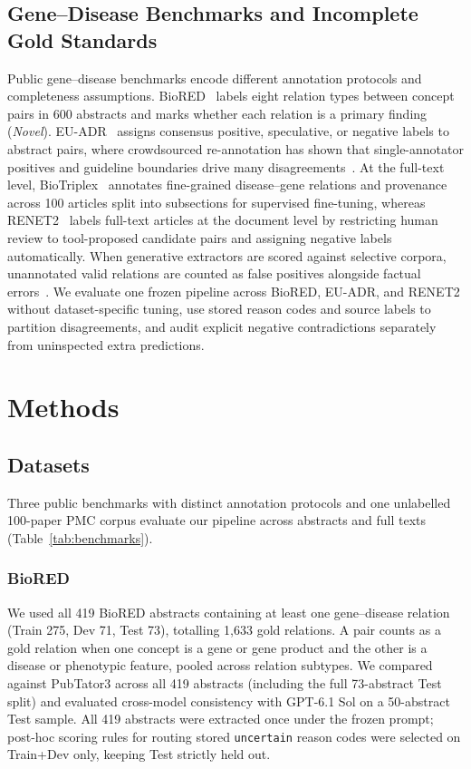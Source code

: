 \documentclass[preprint,10pt,letterpaper]{elsarticle}
\newcommand{\st}[1]{\texttt{#1}}             %
\begin{document}
\subsection{Gene--Disease Benchmarks and Incomplete Gold Standards}
Public gene--disease benchmarks encode different annotation protocols and completeness assumptions. BioRED~\cite{luo2022biored} labels eight relation types between concept pairs in 600 abstracts and marks whether each relation is a primary finding (\emph{Novel}). EU-ADR~\cite{vanmulligen2012euadr} assigns consensus positive, speculative, or negative labels to abstract pairs, where crowdsourced re-annotation has shown that single-annotator positives and guideline boundaries drive many disagreements~\cite{li2015crowdsourcing}. At the full-text level, BioTriplex~\cite{collins2026biotriplex} annotates fine-grained disease--gene relations and provenance across 100 articles split into subsections for supervised fine-tuning, whereas RENET2~\cite{su2021renet2} labels full-text articles at the document level by restricting human review to tool-proposed candidate pairs and assigning negative labels automatically. When generative extractors are scored against selective corpora, unannotated valid relations are counted as false positives alongside factual errors~\cite{wadhwa2023revisiting,fan2024evaluating}. We evaluate one frozen pipeline across BioRED, EU-ADR, and RENET2 without dataset-specific tuning, use stored reason codes and source labels to partition disagreements, and audit explicit negative contradictions separately from uninspected extra predictions.

\section{Methods}

\subsection{Datasets}
Three public benchmarks with distinct annotation protocols and one unlabelled 100-paper PMC corpus evaluate our pipeline across abstracts and full texts (Table~\ref{tab:benchmarks}).

\subsubsection{BioRED}
We used all 419 BioRED abstracts containing at least one gene--disease relation (Train 275, Dev 71, Test 73), totalling 1,633 gold relations. A pair counts as a gold relation when one concept is a gene or gene product and the other is a disease or phenotypic feature, pooled across relation subtypes. We compared against PubTator3 across all 419 abstracts (including the full 73-abstract Test split) and evaluated cross-model consistency with GPT-6.1 Sol on a 50-abstract Test sample. All 419 abstracts were extracted once under the frozen prompt; post-hoc scoring rules for routing stored \st{uncertain} reason codes were selected on Train+Dev only, keeping Test strictly held out.
\end{document}
